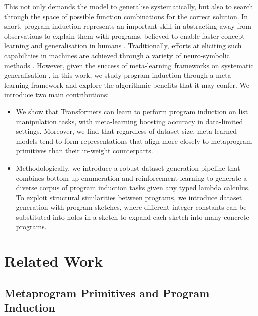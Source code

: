 \documentclass[12pt]{article}
\begin{document}
This not only demands the model to generalise systematically, but also to search through the space of possible function combinations for the correct solution. In short, program induction represents an important skill in abstracting away from observations to explain them with programs, believed to enable faster concept-learning and generalisation in humans \citep{lake2015human}. Traditionally, efforts at eliciting such capabilities in machines are achieved through a variety of neuro-symbolic methods \citep{ellis2023dreamcoder, lake2015human}. However, given the success of meta-learning frameworks on systematic generalisation \citep{lake2023human}, in this work, we study program induction through a meta-learning framework and explore the algorithmic benefits that it may confer. We introduce two main contributions:
\begin{itemize}
    \item We show that Transformers can learn to perform program induction on list manipulation tasks, with meta-learning boosting accuracy in data-limited settings. Moreover, we find that regardless of dataset size, meta-learned models tend to form representations that align more closely to metaprogram primitives than their in-weight counterparts.
    \item Methodologically, we introduce a robust dataset generation pipeline that combines bottom-up enumeration and reinforcement learning to generate a diverse corpus of program induction tasks given any typed lambda calculus. To exploit structural similarities between programs, we introduce dataset generation with program sketches, where different integer constants can be substituted into holes in a sketch to expand each sketch into many concrete programs.
\end{itemize}

\section{Related Work}
\label{sec:related-work}

\subsection{Metaprogram Primitives and Program Induction}
\label{sec:related-metaprimitives}
\end{document}
